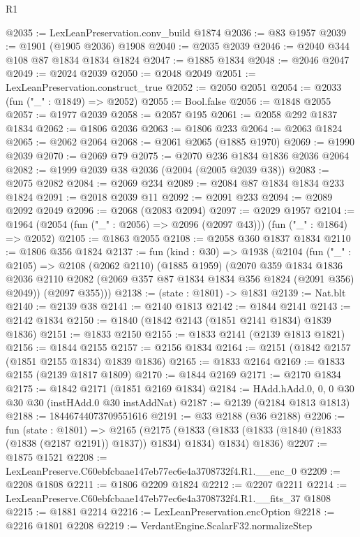 \begin{lexlean}{R1}
\begin{coremodule}
@2035 := LexLeanPreservation.conv_build @1874
@2036 := @83 @1957
@2039 := @1901 (@1905 @2036) @1908
@2040 := @2035 @2039
@2046 := @2040 @344 @108 @87 @1834 @1834 @1824
@2047 := @1885 @1834
@2048 := @2046 @2047
@2049 := @2024 @2039
@2050 := @2048 @2049
@2051 := LexLeanPreservation.construct_true
@2052 := @2050 @2051
@2054 := @2033 (fun ("_" : @1849) => @2052)
@2055 := Bool.false
@2056 := @1848 @2055
@2057 := @1977 @2039
@2058 := @2057 @195
@2061 := @2058 @292 @1837 @1834
@2062 := @1806 @2036
@2063 := @1806 @233
@2064 := @2063 @1824
@2065 := @2062 @2064
@2068 := @2061 @2065 (@1885 @1970)
@2069 := @1990 @2039
@2070 := @2069 @79
@2075 := @2070 @236 @1834 @1836 @2036 @2064
@2082 := @1999 @2039 @38 @2036 (@2004 (@2005 @2039 @38))
@2083 := @2075 @2082
@2084 := @2069 @234
@2089 := @2084 @87 @1834 @1834 @233 @1824
@2091 := @2018 @2039 @11
@2092 := @2091 @233
@2094 := @2089 @2092 @2049
@2096 := @2068 (@2083 @2094)
@2097 := @2029 @1957
@2104 := @1964 (@2054 (fun ("_" : @2056) => @2096 (@2097 @43))) (fun ("_" : @1864) => @2052)
@2105 := @1863 @2055
@2108 := @2058 @360 @1837 @1834
@2110 := @1806 @356 @1824
@2137 := fun (kind : @30) =>
  @1938
    (@2104
      (fun ("_" : @2105) =>
      @2108
        (@2062 @2110)
        (@1885 @1959)
        (@2070
          @359
          @1834
          @1836
          @2036
          @2110
          @2082
          (@2069 @357 @87 @1834 @1834 @356 @1824 (@2091 @356) @2049))
        (@2097 @355)))
@2138 := (state : @1801) -> @1831
@2139 := Nat.blt
@2140 := @2139 @38
@2141 := @2140 @1813
@2142 := @1844 @2141
@2143 := @2142 @1834
@2150 := @1840 (@1842 @2143 (@1851 @2141 @1834) @1839 @1836)
@2151 := @1833 @2150
@2155 := @1833 @2141 (@2139 @1813 @1821)
@2156 := @1844 @2155
@2157 := @2156 @1834
@2164 := @2151 (@1842 @2157 (@1851 @2155 @1834) @1839 @1836)
@2165 := @1833 @2164
@2169 := @1833 @2155 (@2139 @1817 @1809)
@2170 := @1844 @2169
@2171 := @2170 @1834
@2175 := @1842 @2171 (@1851 @2169 @1834)
@2184 := HAdd.hAdd.{0, 0, 0} @30 @30 @30 (instHAdd.{0} @30 instAddNat)
@2187 := @2139 (@2184 @1813 @1813)
@2188 := 18446744073709551616
@2191 := @33 @2188 (@36 @2188)
@2206 := fun (state : @1801) =>
  @2165
    (@2175
      (@1833 (@1833 (@1833 (@1840 (@1833 (@1838 (@2187 @2191)) @1837)) @1834) @1834) @1834)
      @1836)
@2207 := @1875 @1521
@2208 := LexLeanPreserve.C60ebfcbaae147eb77ec6e4a3708732f4.R1.__enc_0
@2209 := @2208 @1808
@2211 := @1806 @2209 @1824
@2212 := @2207 @2211
@2214 := LexLeanPreserve.C60ebfcbaae147eb77ec6e4a3708732f4.R1.__fits_37 @1808
@2215 := @1881 @2214
@2216 := LexLeanPreservation.encOption
@2218 := @2216 @1801 @2208
@2219 := VerdantEngine.ScalarF32.normalizeStep

\end{coremodule}
\end{lexlean}
